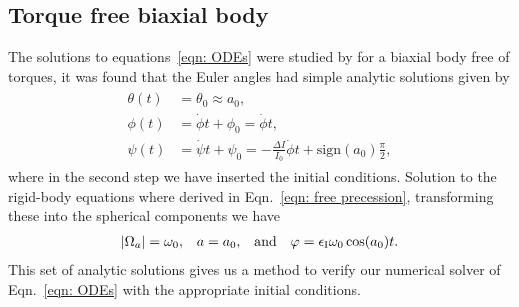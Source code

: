 \documentclass[../full_thesis/full_thesis.tex]{subfiles}
\begin{document}
\subsection{Torque free biaxial body}
\label{sec: biaxial body with no torque}

The solutions to equations~\eqref{eqn: ODEs} were studied by \citet{Jones2001}
for a biaxial body free of torques, it was found that the Euler angles had
simple analytic solutions given by
\begin{align}
\begin{split}
    \theta(t) & = \theta_{0} \approx a_{0}, \\
    \phi(t) & = \dot{\phi}t + \phi_{0} = \dot{\phi} t, \\
    \psi(t) & = \dot{\psi}t + \psi_{0}=
 -\frac{\Delta I}{I_0}\dot{\phi} t + \textrm{sign}(a_0)\frac{\pi}{2},
\end{split}
\label{eqn: euler angles torque free evolution}
\end{align}
where in the second step we have inserted the initial conditions. Solution to
the rigid-body equations where derived in Eqn.~\eqref{eqn: free precession},
transforming these into the spherical components we have
\begin{align}
|\Omega_a| = \omega_0, && a = a_0, &&\textrm{and} && \varphi=\epsilon_{\mathrm{I}}\omega_0 \cos(a_0) t.
\label{eqn: spherical spin torque free evolution}
\end{align}
This set of analytic solutions gives
us a method to verify our numerical solver of Eqn.~\eqref{eqn: ODEs} with the
appropriate initial conditions.
\end{document}
